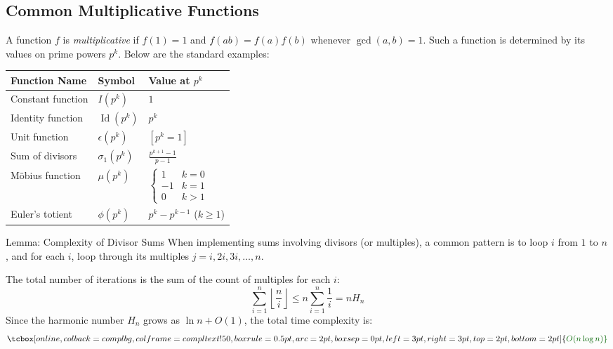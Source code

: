 \documentclass[11pt]{article}
\newcommand{\complexity}[1]{%
  \tcbox[on line, 
    colback=complbg, 
    colframe=compltext!50, 
    boxrule=0.5pt, 
    arc=2pt, 
    boxsep=0pt, 
    left=3pt, right=3pt, top=2pt, bottom=2pt
  ]{\color{compltext}\small\ensuremath{#1}}%
}
\newcommand{\Id}{\operatorname{Id}}
\begin{document}
\subsection{Common Multiplicative Functions}
A function $f$ is \textit{multiplicative} if $f(1)=1$ and $f(ab) = f(a)f(b)$ whenever $\gcd(a,b)=1$. Such a function is determined by its values on prime powers $p^k$. Below are the standard examples:

\begin{center}
    \renewcommand{\arraystretch}{1.5}
    \begin{tabular}{l l l}
        \toprule
        \textbf{Function Name}             & \textbf{Symbol} & \textbf{Value at } $p^k$                                   \\
        \midrule
        Constant function                  & $I(p^k)$        & $1$                                                        \\
        Identity function                  & $\Id(p^k)$      & $p^k$                                                      \\
        Unit function                      & $\epsilon(p^k)$ & $[p^k = 1]$                                                \\
        Sum of divisors                    & $\sigma_1(p^k)$ & $\frac{p^{k+1}-1}{p-1}$                                    \\
        Möbius function                    & $\mu(p^k)$      & $\begin{cases} 1 & k=0 \\ -1 & k=1 \\ 0 & k>1 \end{cases}$ \\
        \rowcolor{boxfill} Euler's totient & $\phi(p^k)$     & $p^k - p^{k-1}$ \quad ($k \ge 1$)                          \\
        \bottomrule
    \end{tabular}
\end{center}

\begin{conceptbox}{Lemma: Complexity of Divisor Sums}
    When implementing sums involving divisors (or multiples), a common pattern is to loop $i$ from $1$ to $n$, and for each $i$, loop through its multiples $j = i, 2i, 3i, \dots, n$.

    The total number of iterations is the sum of the count of multiples for each $i$:
    \[ \sum_{i=1}^n \left\lfloor \frac{n}{i} \right\rfloor \le n \sum_{i=1}^n \frac{1}{i} = n H_n \]
    Since the harmonic number $H_n$ grows as $\ln n + O(1)$, the total time complexity is:
    \[ \complexity{O(n \log n)} \]
\end{conceptbox}
\end{document}
